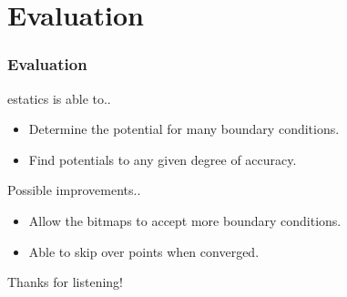 \documentclass{beamer}
\begin{document}
\section{Evaluation}
\begin{frame}
\frametitle{Evaluation}
estatics is able to..
\begin{itemize}
\item Determine the potential for many boundary conditions.
\item Find potentials to any given degree of accuracy.
\end{itemize}
Possible improvements..
\begin{itemize}

\item Allow the bitmaps to accept more boundary conditions.
\item Able to skip over points when converged.
\end{itemize}
Thanks for listening!
\end{frame}
\end{document}
